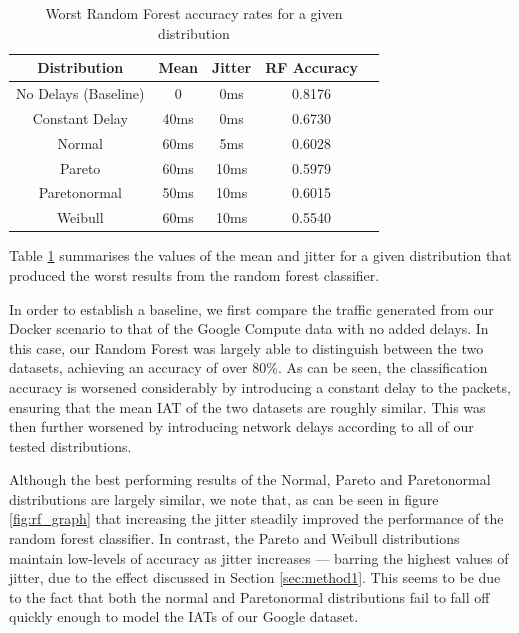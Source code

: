\documentclass[msc,deptreport, cs]{infthesis} %
\begin{document}
\begin{table}[ht!]
\begin{center}
\begin{small}
\begin{sc}
\begin{tabular}{ccccc}
\hline
\abovespace\belowspace
Distribution & Mean & Jitter & RF Accuracy\\
\hline
\abovespace
No Delays (Baseline)         & 0          & 0ms         & 0.8176                 \\
Constant Delay          & 40ms          & 0ms         & 0.6730                 \\
Normal          & 60ms          & 5ms          & 0.6028                \\
Pareto          & 60ms          & 10ms          & 0.5979                \\
Paretonormal          & 50ms          &  10ms         & 0.6015                \\
\belowspace
Weibull          & 60ms          & 10ms          & 0.5540               \\
\hline
\end{tabular}
\end{sc}
\end{small}
\vskip -2mm
\caption{Worst Random Forest accuracy rates for a given distribution}
\label{tab:results-iat_rf}
\end{center}
\vskip -4mm
\end{table}

Table \ref{tab:results-iat_rf} summarises the values of the mean and jitter for a given distribution that produced the worst results from the random forest classifier.

In order to establish a baseline, we first compare the traffic generated from our Docker scenario to that of the Google Compute data with no added delays. In this case, our Random Forest was largely able to distinguish between the two datasets, achieving an accuracy of over 80\%. As can be seen, the classification accuracy is worsened considerably by introducing a constant delay to the packets, ensuring that the mean IAT of the two datasets are roughly similar. This was then further worsened by introducing network delays according to all of our tested distributions.

Although the best performing results of the Normal, Pareto and Paretonormal distributions are largely similar, we note that, as can be seen in figure \ref{fig:rf_graph} that increasing the jitter steadily improved the performance of the random forest classifier. In contrast, the Pareto and Weibull distributions maintain low-levels of accuracy as jitter increases --- barring the highest values of jitter, due to the effect discussed in Section \ref{sec:method1}. This seems to be due to the fact that both the normal and Paretonormal distributions fail to fall off quickly enough to model the IATs of our Google dataset.
\end{document}
